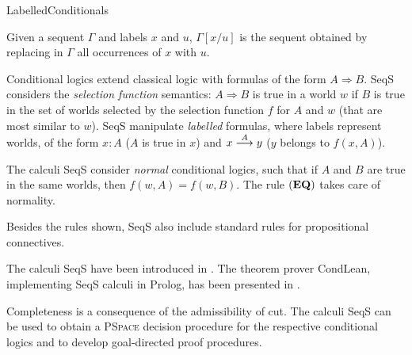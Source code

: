 \begin{entry}{LabelledConditionals}
\begin{calculus}
\begin{footnotesize}
{\scriptsize Given a sequent $\Gamma$ and labels $x$ and $u$,  $\Gamma[x/u]$ is the sequent obtained by replacing in $\Gamma$ all occurrences of $x$ with $u$.}
\end{footnotesize}
\end{calculus}



 \begin{clarifications}
Conditional logics extend classical logic with formulas of the form $A \Rightarrow B$. SeqS considers the \emph{selection function} semantics:  $A \Rightarrow B$ is true in a world $w$ if $B$ is true in the set of worlds selected by the selection function $f$ for $A$ and $w$ (that are most similar to $w$). SeqS manipulate \emph{labelled} formulas, where labels represent worlds, of the form $x: A$ ($A$ is true in $x$) and $x \stackrel{A}{\longrightarrow} y$ ($y$ belongs to $f(x,A)$).

The calculi SeqS consider \emph{normal} conditional logics, such that if $A$ and $B$ are true in the same worlds, then $f(w,A)=f(w,B)$. The rule $({\bf EQ})$ takes care of normality.

  Besides the rules shown, SeqS also include standard 
   rules for propositional connectives.
 \end{clarifications}

 \begin{history}
  The calculi SeqS have been introduced in 
  \cite{toclpozz}. The theorem prover CondLean, implementing SeqS calculi in Prolog, has been presented in \cite{tab2003pozz,tab2005pozz}.
 \end{history}

 \begin{technicalities}
Completeness is a consequence of the admissibility of cut. The calculi SeqS can be used to obtain a \textsc{PSpace} decision procedure for the respective conditional logics and to develop goal-directed proof procedures.
 \end{technicalities}













\end{entry}
